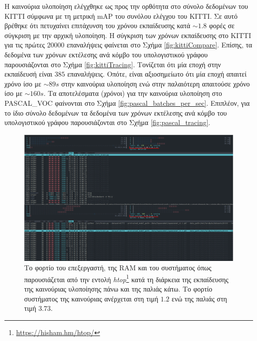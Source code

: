 Η καινούρια υλοποίηση ελέγχθηκε ως προς την ορθότητα στο σύνολο δεδομένων του KITTI \cite{80} σύμφωνα με τη μετρική mAP του συνόλου ελέγχου του KITTI. Σε αυτό βρέθηκε ότι πετυχαίνει επιτάχυνση του χρόνου εκπαίδευσης κατά $\sim1.8$ φορές σε σύγκριση με την αρχική υλοποίηση. Η σύγκριση των χρόνων εκπαίδευσης στο KITTI για τις πρώτες $20000$ επαναλήψεις φαίνεται στο Σχήμα \ref{fig:kittiCompare}. Επίσης, τα δεδομένα των χρόνων εκτέλεσης ανά κόμβο του υπολογιστικού γράφου παρουσιάζονται στο Σχήμα \ref{fig:kittiTracing}. Τονίζεται ότι μία εποχή στην εκπαίδευσή είναι $385$ επαναλήψεις. Οπότε, είναι αξιοσημείωτο ότι μία εποχή απαιτεί χρόνο ίσο με $\sim89 s$ στην καινούρια υλοποίηση ενώ στην παλαιότερη απαιτούσε χρόνο ίσο με $\sim160 s$. Τα αποτελέσματα (χρόνοι) για την καινούρια υλοποίηση στο PASCAL\_VOC φαίνονται στο Σχήμα \ref{fig:pascal_batches_per_sec}. Επιπλέον, για το ίδιο σύνολο δεδομένων τα δεδομένα των χρόνων εκτέλεσης ανά κόμβο του υπολογιστικού γράφου παρουσιάζονται στο Σχήμα \ref{fig:pascal_tracing}.


\begin{figure}
    \centering
    \includegraphics[width=\textwidth]{figures/experiments/load_comparison.pdf}
    \caption[Σύγκριση φορτίου υλοποιήσεων]{Το φορτίο του επεξεργαστή, της RAM και του συστήματος όπως παρουσιάζεται από την εντολή \textit{htop}\footnote{\url{https://hisham.hm/htop/}} κατά τη διάρκεια της εκπαίδευσης της καινούριας υλοποίησης πάνω και της παλιάς κάτω. Το φορτίο συστήματος της καινούριας ανέρχεται στη τιμή $1.2$ ενώ της παλιάς στη τιμή $3.73$.}
    \label{fig:loadCompare}
\end{figure}

